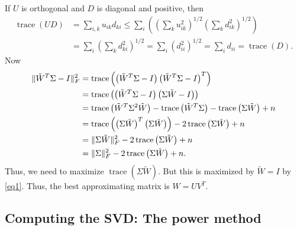 \documentclass{article}
\begin{document}
If $U$ is orthogonal and $D$ is diagonal and positive, then
\begin{equation}\label{eq1}
\begin{aligned}
\operatorname{trace} (UD) &= \sum_{i,k} u_{ik} d_{ki} \leq \sum _{i}
\left ( \left ( \sum_{k} u_{ik}^{2} \right )^{1/2} \left ( \sum_{k}
d_{ik}^{2} \right )^{1/2} \right ) \\
&= \sum_{i} \left ( \sum_{k} d_{ki}^{2} \right )^{1/2} = \sum_{i}
\left ( d_{ii}^{2} \right )^{1/2} = \sum_{i} d_{ii} =
\operatorname{trace}(D).
\end{aligned}
\end{equation}
Now
\begin{align*}
\| \tilde{W}^{T} \Sigma - I \|_{F}^{2} &= \operatorname{trace}
\left ( \left( \tilde{W}^{T} \Sigma - I \right ) \left(
\tilde{W}^{T} \Sigma - I \right )^{T} \right ) \\
&= \operatorname{trace} \left ( \left( \tilde{W}^{T} \Sigma   - I
\right
) \left( \Sigma \tilde{W}  - I \right ) \right ) \\
&= \operatorname{trace} \left ( \tilde{W}^{T} \Sigma^{2} \tilde{W}
\right ) - \operatorname{trace} \left ( \tilde{W}^{T} \Sigma \right
) - \operatorname{trace} \left ( \Sigma \tilde{W} \right ) + n \\
&= \operatorname{trace} \left ( \left ( \Sigma \tilde{W} \right
)^{T} \left ( \Sigma \tilde{W}  \right ) \right ) - 2
\operatorname{trace} \left (\Sigma \tilde{W} \right ) + n \\
&= \| \Sigma \tilde{W} \|_{F}^{2} - 2 \operatorname{trace} \left
(\Sigma \tilde{W} \right ) + n \\
&= \| \Sigma  \|_{F}^{2} - 2 \operatorname{trace} \left (\Sigma
\tilde{W} \right ) + n.
\end{align*}
Thus, we need to maximize $\operatorname{trace} \left (\Sigma
\tilde{W} \right )$. But this is maximized by $ \tilde{W} = I$ by
\eqref{eq1}. Thus, the best approximating matrix is $W=UV^{T}$.





\subsection*{Computing the SVD: The power method}
\end{document}
